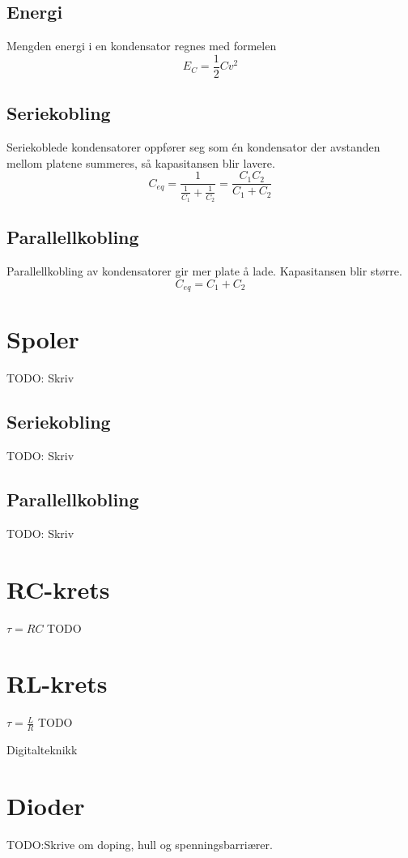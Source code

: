 \documentclass[12pt,a4paper,norsk]{article}
\newcommand{\resi}[1]{\frac{1}{#1}}
\begin{document}
\subsection{Energi}
Mengden energi i en kondensator regnes med formelen
\[E_{C} = \resi{2} C v^{2}\]

\subsection{Seriekobling}
Seriekoblede kondensatorer oppfører seg som én kondensator der avstanden mellom
platene summeres, så kapasitansen blir lavere.
\[C_{eq} = \resi{\resi{C_{1}}+\resi{C_{2}}} = \frac{C_1C_2}{C_1 + C_2}\]

\subsection{Parallellkobling}
Parallellkobling av kondensatorer gir mer plate å lade. Kapasitansen blir
større.
\[C_{eq} = C_{1} + C_{2}\]

\section{Spoler}\label{sec:spoler}
TODO\@: Skriv

\subsection{Seriekobling}
TODO\@: Skriv

\subsection{Parallellkobling}
TODO\@: Skriv

\section{RC-krets}
$\tau = RC$ TODO

\section{RL-krets}
$\tau = \frac{L}{R}$ TODO

\clearpage
{}
\begin{center}
  {\LARGE Digitalteknikk}
\end{center}

\section{Dioder}\label{sec:dioder}
TODO\@:Skrive om doping, hull og spenningsbarriærer.
\end{document}
